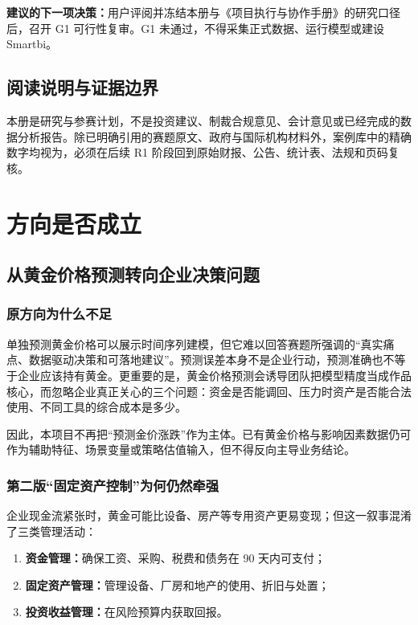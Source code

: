\documentclass[UTF8,12pt,openany]{ctexbook}
\begin{document}
\noindent\textbf{建议的下一项决策：}用户评阅并冻结本册与《项目执行与协作手册》的研究口径后，召开 G1 可行性复审。G1 未通过，不得采集正式数据、运行模型或建设 Smartbi。

\chapter*{阅读说明与证据边界}
本册是研究与参赛计划，不是投资建议、制裁合规意见、会计意见或已经完成的数据分析报告。除已明确引用的赛题原文、政府与国际机构材料外，案例库中的精确数字均视为\PendingTag，必须在后续 R1 阶段回到原始财报、公告、统计表、法规和页码复核。

\EvidenceLegend

\tableofcontents

\mainmatter
\part{方向是否成立}

\chapter{从黄金价格预测转向企业决策问题}

\section{原方向为什么不足}
单独预测黄金价格可以展示时间序列建模，但它难以回答赛题所强调的“真实痛点、数据驱动决策和可落地建议”。预测误差本身不是企业行动，预测准确也不等于企业应该持有黄金。更重要的是，黄金价格预测会诱导团队把模型精度当成作品核心，而忽略企业真正关心的三个问题：资金是否能调回、压力时资产是否能合法使用、不同工具的综合成本是多少。

因此，本项目不再把“预测金价涨跌”作为主体。已有黄金价格与影响因素数据仍可作为辅助特征、场景变量或策略估值输入，但不得反向主导业务结论。

\section{第二版“固定资产控制”为何仍然牵强}
企业现金流紧张时，黄金可能比设备、房产等专用资产更易变现；但这一叙事混淆了三类管理活动：

\begin{enumerate}
  \item \textbf{资金管理：}确保工资、采购、税费和债务在 90 天内可支付；
  \item \textbf{固定资产管理：}管理设备、厂房和地产的使用、折旧与处置；
  \item \textbf{投资收益管理：}在风险预算内获取回报。
\end{enumerate}
\end{document}
